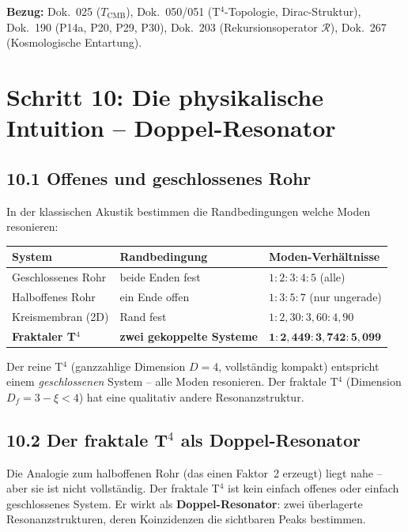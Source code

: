 \noindent\textbf{Bezug:} Dok.~025 ($T_\mathrm{CMB}$),
Dok.~050/051 (T$^4$-Topologie, Dirac-Struktur),
Dok.~190 (P14a, P20, P29, P30),
Dok.~203 (Rekursionsoperator $\mathcal{R}$),
Dok.~267 (Kosmologische Entartung).

\section{Schritt 10: Die physikalische Intuition -- Doppel-Resonator}

\subsection*{10.1 Offenes und geschlossenes Rohr}

In der klassischen Akustik bestimmen die Randbedingungen welche Moden
resonieren:

\begin{center}
\begin{tabular}{p{3.8cm}p{3.4cm}p{5.2cm}}
\toprule
\textbf{System} & \textbf{Randbedingung} & \textbf{Moden-Verhältnisse} \\
\midrule
Geschlossenes Rohr & beide Enden fest & $1:2:3:4:5$ (alle) \\
Halboffenes Rohr & ein Ende offen & $1:3:5:7$ (nur ungerade) \\
Kreismembran (2D) & Rand fest & $1:2{,}30:3{,}60:4{,}90$ \\
\midrule
\textbf{Fraktaler T$^4$} & \textbf{zwei gekoppelte Systeme} &
  $\mathbf{1:2{,}449:3{,}742:5{,}099}$ \\
\bottomrule
\end{tabular}
\end{center}

Der reine T$^4$ (ganzzahlige Dimension $D=4$, vollständig kompakt)
entspricht einem \emph{geschlossenen} System -- alle Moden resonieren.
Der fraktale T$^4$ (Dimension $D_f = 3-\xi < 4$) hat eine
qualitativ andere Resonanzstruktur.

\subsection*{10.2 Der fraktale T$^4$ als Doppel-Resonator}

Die Analogie zum halboffenen Rohr (das einen Faktor~2 erzeugt) liegt
nahe -- aber sie ist nicht vollständig. Der fraktale T$^4$ ist
kein einfach offenes oder einfach geschlossenes System. Er wirkt
als \textbf{Doppel-Resonator}: zwei überlagerte Resonanzstrukturen,
deren Koinzidenzen die sichtbaren Peaks bestimmen.

